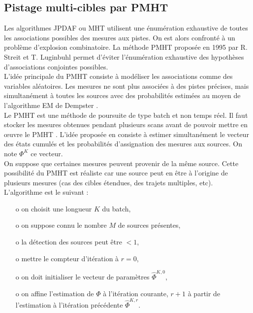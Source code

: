 \documentclass[10pt,french,a4paper]{report}
\begin{document}
\subsection{Pistage multi-cibles par \ac{PMHT}}

 Les algorithmes \ac{JPDAF} ou \ac{MHT} utilisent une 
énumération exhaustive de toutes les associations possibles des  mesures aux pistes.  On est alors confronté à un problème d'explosion combinatoire.  La méthode \acf{PMHT} 
proposée en 1995 par R.   Streit et T.  Luginbuhl \cite{Streit_Luginbuhl_1993,Streit_Luginbuhl_1994,Streit_Luginbuhl_1995}
permet d'éviter l'énumération exhaustive des hypothèses d'associations conjointes possibles.\\

L'idée principale du \ac{PMHT} consiste à modéliser les associations comme des variables aléatoires.  Les mesures ne sont plus associées à des pistes précises, mais simultanément à toutes les sources avec des probabilités estimées au 
moyen de l'algorithme \acf{EM}  de Dempster \cite{Dempster_Laird_Rubin_1977}.\\

Le \ac{PMHT} est une méthode de poursuite 
de type batch et non temps réel. Il faut stocker les mesures obtenues pendant plusieurs scans avant de pouvoir mettre en {\oe}uvre le \ac{PMHT} \cite{Gauvrit_1997}. L'idée proposée en \cite{Streit_Luginbuhl_1995} consiste à estimer simultanément le vecteur des états cumulés et les probabilités d'assignation des mesures aux sources. On note $\Phi^K$ ce vecteur.\\
On suppose que certaines mesures peuvent provenir de la même source. Cette possibilité du \ac{PMHT} est réaliste car une source peut en être à l'origine de plusieurs mesures (cas des cibles étendues, des trajets 
multiples, etc).\\

L'algorithme est le suivant :

\begin{itemize}
\item[o] on choisit une longueur $K$ du batch,
\item[o] on suppose connu le nombre $M$ de sources présentes,
\item[o] la détection des sources peut être $< 1$,
\item[o] mettre le compteur d'itération à $r=0$,
\item[o] on doit initialiser le vecteur de paramètres 
$\hat{\Phi}^{K,0}$,
\item[o] on affine l'estimation de $\Phi$ à l'itération courante,
$r+1$ à partir de l'estimation à l'itération précédente 
$\hat{\Phi}^{K,r}$.
\end{itemize}
\end{document}
